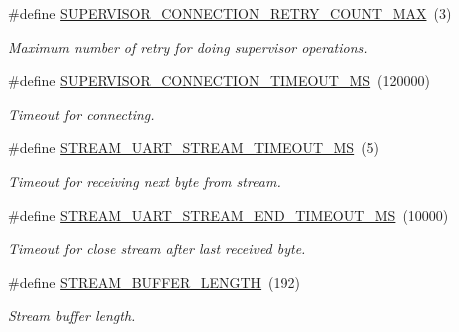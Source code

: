 \begin{DoxyCompactItemize}
\#define \hyperlink{rmap-config_8h_a8c44e74b589622bd3a3c69bfdc754a3b}{S\+U\+P\+E\+R\+V\+I\+S\+O\+R\+\_\+\+C\+O\+N\+N\+E\+C\+T\+I\+O\+N\+\_\+\+R\+E\+T\+R\+Y\+\_\+\+C\+O\+U\+N\+T\+\_\+\+M\+AX}~(3)
\begin{DoxyCompactList}\small\item\em Maximum number of retry for doing supervisor operations. \end{DoxyCompactList}\item 
\mbox{\label{rmap-config_8h_a52ca4538c4f04d08d9b1f35329926912}} 
\#define \hyperlink{rmap-config_8h_a52ca4538c4f04d08d9b1f35329926912}{S\+U\+P\+E\+R\+V\+I\+S\+O\+R\+\_\+\+C\+O\+N\+N\+E\+C\+T\+I\+O\+N\+\_\+\+T\+I\+M\+E\+O\+U\+T\+\_\+\+MS}~(120000)
\begin{DoxyCompactList}\small\item\em Timeout for connecting. \end{DoxyCompactList}\item 
\mbox{\label{rmap-config_8h_aa5742869009a8ff3a6e3dfcb700f3ab6}} 
\#define \hyperlink{rmap-config_8h_aa5742869009a8ff3a6e3dfcb700f3ab6}{S\+T\+R\+E\+A\+M\+\_\+\+U\+A\+R\+T\+\_\+\+S\+T\+R\+E\+A\+M\+\_\+\+T\+I\+M\+E\+O\+U\+T\+\_\+\+MS}~(5)
\begin{DoxyCompactList}\small\item\em Timeout for receiving next byte from stream. \end{DoxyCompactList}\item 
\mbox{\label{rmap-config_8h_a950ba415f1afc5bdc2d4ea52b51075df}} 
\#define \hyperlink{rmap-config_8h_a950ba415f1afc5bdc2d4ea52b51075df}{S\+T\+R\+E\+A\+M\+\_\+\+U\+A\+R\+T\+\_\+\+S\+T\+R\+E\+A\+M\+\_\+\+E\+N\+D\+\_\+\+T\+I\+M\+E\+O\+U\+T\+\_\+\+MS}~(10000)
\begin{DoxyCompactList}\small\item\em Timeout for close stream after last received byte. \end{DoxyCompactList}\item 
\mbox{\label{rmap-config_8h_ac5fc989b784c420be7db4f66417fc744}} 
\#define \hyperlink{rmap-config_8h_ac5fc989b784c420be7db4f66417fc744}{S\+T\+R\+E\+A\+M\+\_\+\+B\+U\+F\+F\+E\+R\+\_\+\+L\+E\+N\+G\+TH}~(192)
\begin{DoxyCompactList}\small\item\em Stream buffer length. \end{DoxyCompactList}\item 

\end{DoxyCompactItemize}
